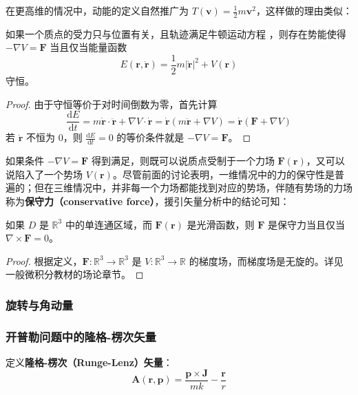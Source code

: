 \documentclass[cn,10pt,math=newtx,citestyle=gb7714-2015,bibstyle=gb7714-2015]{elegantbook}
\def\bm{\boldsymbol}
\def\d{\mathrm d}
\def\R{\mathbb R}
\def\ra{\rightarrow}
\begin{document}
在更高维的情况中，动能的定义自然推广为 $T(\bm v)=\frac{1}{2}m \bm v^2$，这样做的理由类似：

\begin{theorem}[能量守恒定律（v1.0）]
    如果一个质点的受力只与位置有关，且轨迹满足牛顿运动方程 ，则存在势能使得 $-\nabla V=\bm F$ 当且仅当能量函数
    \begin{equation}
        E(\bm r,\dot{\bm r})=\frac{1}{2}m|\dot{\bm r}|^2+V(\bm r)
    \end{equation}
    守恒。
\end{theorem}
\begin{proof}
    由于守恒等价于对时间倒数为零，首先计算
    \begin{equation}
        \frac{\d E}{\d t}=m\dot{\bm r}\cdot\ddot{\bm r}+\nabla V\cdot\dot{\bm r}=\dot{\bm r}(m\ddot{\bm r}+\nabla V)=\dot{\bm r}(\bm F+\nabla V)
    \end{equation}
    若 $\dot{\bm r}$ 不恒为 0，则 $\frac{\d E}{\d t}=0$ 的等价条件就是 $-\nabla V=\bm F$。
\end{proof}
如果条件 $-\nabla V=\bm F$ 得到满足，则既可以说质点受制于一个力场 $\bm F(\bm r)$，又可以说陷入了一个势场 $V(\bm r)$。尽管前面的讨论表明，一维情况中的力的保守性是普遍的；但在三维情况中，并非每一个力场都能找到对应的势场，伴随有势场的力场称为\textbf{保守力（conservative force）}，援引矢量分析中的结论可知：

\begin{theorem}[保守力的等价条件]
    如果 $D$ 是 $\R^3$ 中的单连通区域，而 $\bm F(\bm r)$ 是光滑函数，则 $\bm F$ 是保守力当且仅当 $\nabla\times\bm F=0$。
\end{theorem}
\begin{proof}
    根据定义，$\bm F:\R^3\ra \R^3$ 是 $V:\R^3\ra\R$ 的梯度场，而梯度场是无旋的。详见一般微积分教材的场论章节。
\end{proof}

\subsubsection{旋转与角动量}

\subsubsection{开普勒问题中的隆格-楞次矢量}
定义\textbf{隆格-楞次（Runge-Lenz）矢量}：
\begin{equation*}
    \bm A(\bm r,\bm p) = \frac{\bm p\times\bm J}{mk}-\frac{\bm r}{r}
\end{equation*}
\end{document}
